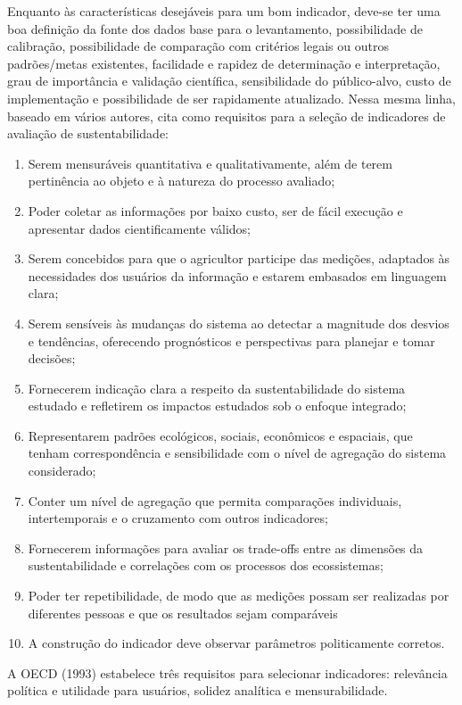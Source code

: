 Enquanto às características desejáveis para um bom indicador, deve-se
ter uma boa definição da fonte dos dados base para o levantamento,
possibilidade de calibração, possibilidade de comparação com critérios
legais ou outros padrões/metas existentes, facilidade e rapidez de
determinação e interpretação, grau de importância e validação científica,
sensibilidade do público-alvo, custo de implementação e possibilidade
de ser rapidamente atualizado. Nessa mesma linha, \citep{zampieri2003metodo}
baseado em vários autores, cita como requisitos para a seleção de
indicadores de avaliação de sustentabilidade: \renewcommand{\labelenumi}{\roman{enumi}.}
\begin{enumerate}
\item Serem mensuráveis quantitativa e qualitativamente, além de terem pertinência
ao objeto e à natureza do processo avaliado; 
\item Poder coletar as informações por baixo custo, ser de fácil execução
e apresentar dados cientificamente válidos; 
\item Serem concebidos para que o agricultor participe das medições, adaptados
às necessidades dos usuários da informação e estarem embasados em
linguagem clara; 
\item Serem sensíveis às mudanças do sistema ao detectar a magnitude dos
desvios e tendências, oferecendo prognósticos e perspectivas para
planejar e tomar decisões; 
\item Fornecerem indicação clara a respeito da sustentabilidade do sistema
estudado e refletirem os impactos estudados sob o enfoque integrado; 
\item Representarem padrões ecológicos, sociais, econômicos e espaciais,
que tenham correspondência e sensibilidade com o nível de agregação
do sistema considerado; 
\item Conter um nível de agregação que permita comparações individuais,
intertemporais e o cruzamento com outros indicadores; 
\item Fornecerem informações para avaliar os trade-offs entre as dimensões
da sustentabilidade e correlações com os processos dos ecossistemas; 
\item Poder ter repetibilidade, de modo que as medições possam ser realizadas
por diferentes pessoas e que os resultados sejam comparáveis
\item A construção do indicador deve observar parâmetros politicamente corretos.
\end{enumerate}
A OECD (1993) estabelece três requisitos para selecionar indicadores:
relevância política e utilidade para usuários, solidez analítica e
mensurabilidade. 

